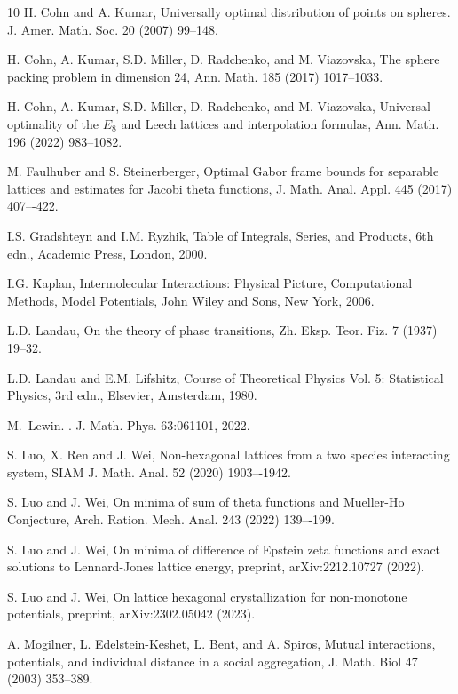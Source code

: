 \documentclass[12pt]{interact}
\theoremstyle{definition}
\begin{document}
\begin{thebibliography}{10}
 H. Cohn and A. Kumar,
Universally optimal distribution of points on spheres.
J. Amer. Math. Soc. 20 (2007) 99--148.

 H. Cohn, A. Kumar, S.D. Miller, D. Radchenko, and
M. Viazovska,
The sphere packing problem in dimension 24,
Ann. Math. 185 (2017) 1017--1033.

 H. Cohn, A. Kumar, S.D. Miller, D. Radchenko, and
M. Viazovska,
Universal optimality of the $E_8$ and Leech lattices and interpolation
formulas,
Ann. Math. 196 (2022) 983--1082.

 M. Faulhuber and S. Steinerberger, 
Optimal Gabor frame bounds for separable lattices and estimates
for Jacobi theta functions,
J. Math. Anal. Appl. 445 (2017) 407–-422.

 I.S. Gradshteyn and I.M. Ryzhik,
Table of Integrals, Series, and Products, 6th edn., 
Academic Press, London, 2000.

 I.G. Kaplan, 
Intermolecular Interactions: Physical Picture, Computational Methods,
Model Potentials,
John Wiley and Sons, New York, 2006.

 L.D. Landau,
On the theory of phase transitions,
Zh. Eksp. Teor. Fiz. 7 (1937) 19--32.  

 L.D. Landau and E.M. Lifshitz,
Course of Theoretical Physics Vol. 5: Statistical Physics, 3rd edn.,
Elsevier, Amsterdam, 1980.  

M.~Lewin.
.
\newblock J. Math. Phys. 63:061101, 2022.

 S. Luo, X. Ren and J. Wei,
Non-hexagonal lattices from a two species interacting system,
SIAM J. Math. Anal. 52 (2020) 1903–-1942.

 S. Luo and J. Wei,
On minima of sum of theta functions and Mueller-Ho Conjecture,
Arch. Ration. Mech. Anal. 243 (2022) 139–-199.

 S. Luo and J. Wei,
On minima of difference of Epstein zeta functions and exact solutions
to Lennard-Jones lattice energy,
preprint, arXiv:2212.10727 (2022).

 S. Luo and J. Wei,
On lattice hexagonal crystallization for non-monotone potentials,
preprint, arXiv:2302.05042 (2023).

 A. Mogilner, L. Edelstein-Keshet, L. Bent, and A. Spiros,
Mutual interactions, potentials, and individual distance in a social
aggregation,
J. Math. Biol 47 (2003) 353--389.


\end{thebibliography}
\end{document}

